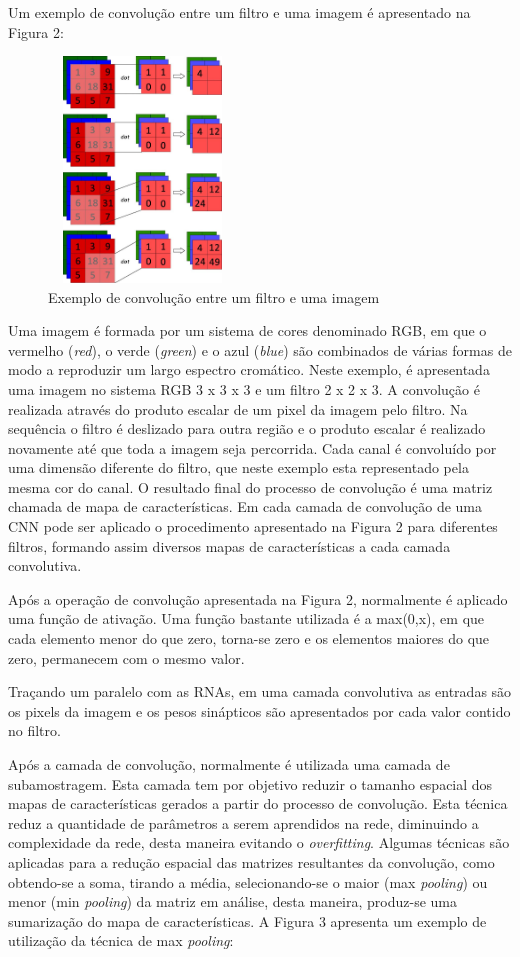 \documentclass[conference]{IEEEtran}
\begin{document}
		Um exemplo de convolução entre um filtro e uma imagem é apresentado na Figura 2:
		
		\begin{figure}[h!b]
			\centering \includegraphics[width=5cm,height=6cm]{convolucao.jpg}
			\caption{Exemplo de convolução entre um filtro e uma imagem \cite{b2}} 
		\end{figure}
         
        Uma imagem é formada por um sistema de cores denominado RGB, em que o vermelho (\textit{red}), o verde (\textit{green}) e o azul (\textit{blue}) são combinados de várias formas de modo a reproduzir um largo espectro cromático. Neste exemplo, é apresentada uma imagem no sistema RGB 3 x 3 x 3 e um filtro 2 x 2 x 3. A convolução é realizada através do produto escalar de um pixel da imagem pelo filtro. Na sequência o filtro é deslizado para outra região e o produto escalar é realizado novamente até que toda a imagem seja percorrida. Cada canal é convoluído por uma dimensão diferente do filtro, que neste exemplo esta representado pela mesma cor do canal. O resultado final do processo de convolução é uma matriz chamada de mapa de características. Em cada camada de convolução de uma CNN pode ser aplicado o procedimento apresentado na Figura 2 para diferentes filtros, formando assim diversos mapas de características a cada camada convolutiva. 
        
         Após a operação de convolução apresentada na Figura 2, normalmente é aplicado uma função de ativação. Uma função bastante utilizada é a max(0,x), em que cada elemento menor do que zero, torna-se zero e os elementos maiores do que zero, permanecem com o mesmo valor.
         
         Traçando um paralelo com as RNAs, em uma camada convolutiva as entradas são os pixels da imagem e os pesos sinápticos são apresentados por cada valor contido no filtro. 

		  Após a camada de convolução, normalmente é utilizada uma camada de subamostragem. Esta camada tem por objetivo reduzir o tamanho espacial dos mapas de características gerados a partir do processo de convolução. Esta técnica reduz a quantidade de parâmetros a serem aprendidos na rede, diminuindo a complexidade da rede, desta maneira evitando o \textit{overfitting}. Algumas técnicas são aplicadas para a redução espacial das matrizes resultantes da convolução, como obtendo-se a soma, tirando a média, selecionando-se o maior (max \textit{pooling}) ou menor (min \textit{pooling}) da matriz em análise, desta maneira, produz-se uma sumarização do mapa de características. A Figura 3 apresenta um exemplo de utilização da técnica de max \textit{pooling}:
         
\end{document}
